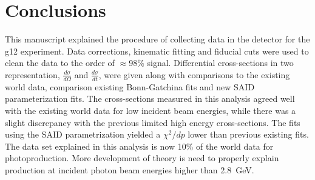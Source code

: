 \section{Conclusions}
This manuscript explained the procedure of collecting data in the  detector for the g12 experiment. Data corrections, kinematic fitting and fiducial cuts were used to clean the data to the order of $\approx$98\% signal. Differential cross-sections in two representation, $\frac{d\sigma}{d\Omega}$ and $\frac{d\sigma}{dt}$, were given along with comparisons to the existing world data, comparison existing Bonn-Gatchina fits and new SAID parameterization fits. The cross-sections measured in this analysis agreed well with the existing world data for low incident beam energies, while there was a slight discrepancy with the previous limited high energy cross-sections. The fits using the SAID parametrization yielded a $\chi^2/dp$ lower than previous existing fits. The data set explained in this analysis is now 10\% of the world data for \pizT photoproduction. More development of theory is need to properly explain \pizT production at incident photon beam energies higher than 2.8~GeV.





 